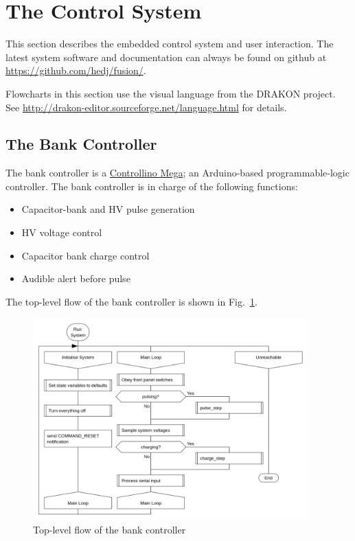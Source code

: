 
\section{The Control System}

This section describes the embedded control system and user interaction.
The latest system software and documentation can always be found on github at \url{https://github.com/hedj/fusion/}.

Flowcharts in this section use the visual language from the DRAKON project. See \url{http://drakon-editor.sourceforge.net/language.html} for details.

\subsection{The Bank Controller}

The bank controller is a \href{http://controllino.biz/product/controllino-mega/}{Controllino Mega}; an
Arduino-based programmable-logic controller. The bank controller is in charge of the following functions:
\begin{itemize}
  \item{Capacitor-bank and HV pulse generation}
  \item{HV voltage control}
  \item{Capacitor bank charge control}
  \item{Audible alert before pulse}
\end{itemize}

The top-level flow of the bank controller is shown in Fig.~\ref{fig:toplevelbank}.

\begin{figure}
  \includegraphics[width=400px]{top-level-flowchart.png}
\caption{\label{fig:toplevelbank} Top-level flow of the bank controller}
\end{figure}

